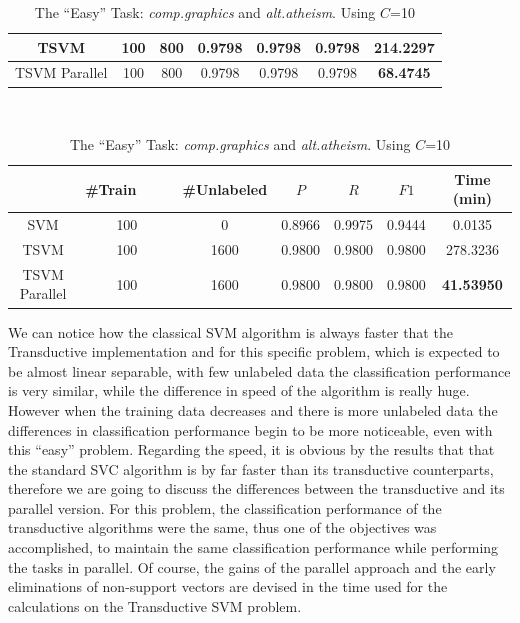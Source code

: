 \begin{table}
\begin{longtable}
\begin{tabular}{|c|c|c|c|c|c||c|}
\hline 
TSVM & 100 & 800 & 0.9798 & 0.9798 & 0.9798 & 214.2297\tabularnewline
\hline 
TSVM Parallel & 100 & 800 & 0.9798 & 0.9798 & 0.9798 & 	\textbf{68.4745}\tabularnewline
\hline
\end{tabular}\\
\tabularnewline
\tabularnewline
\begin{tabular}{|c|c|c|c|c|c||c|}
\hline 
 & \#Train\ \ \ \ & \#Unlabeled & $P$  & $R$  & $F1$  & Time (min)\tabularnewline
\hline
\hline 
SVM & 100 & 0 & 0.8966 & 0.9975 & 0.9444 & 0.0135\tabularnewline
\hline 
TSVM & 100 & 1600 & 0.9800 & 0.9800 & 0.9800 & 278.3236%
\tabularnewline
\hline 
TSVM Parallel & 100 & 1600 & 0.9800 & 0.9800 & 0.9800 & \textbf{41.53950}\tabularnewline
\hline
\end{tabular}\tabularnewline
\end{longtable}

\caption{The {}``Easy'' Task:\emph{ comp.graphics} and \emph{alt.atheism}.
Using $C$=10 \label{tab:Easy-Task:comp.graphics-and} }

\end{table}

We can notice how the classical SVM algorithm is always faster that
the Transductive implementation and for this specific problem, which
is expected to be almost linear separable, with few unlabeled data
the classification performance is very similar, while the difference
in speed of the algorithm is really huge. However when the training
data decreases and there is more unlabeled data the differences
in classification performance begin to be more noticeable, even with
this {}``easy'' problem. Regarding the speed, it is obvious by the
results that that the standard SVC algorithm is by far faster than
its transductive counterparts, therefore we are going to discuss the
differences between the transductive and its parallel version. For
this problem, the classification performance of the transductive algorithms
were the same, thus one of the objectives was accomplished, to maintain
the same classification performance while performing the tasks in
parallel. Of course, the gains of the parallel approach and the early
eliminations of non-support vectors are devised in the time used for
the calculations on the Transductive SVM problem.


